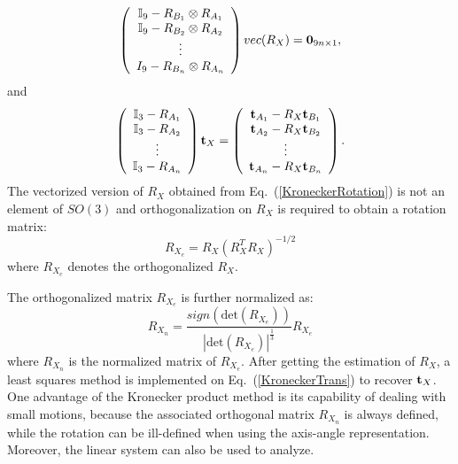 \documentclass[twocolumn,10pt]{asme2ej}
\newcommand{\ttt}{{\bf t}}
\begin{document}
\begin{equation}
\left(
\begin{array}{c}
\mathbb{I}_{9} - R_{B_{1}} \otimes R_{A_{1}}\\
\mathbb{I}_{9} - R_{B_{2}} \otimes R_{A_{2}}\\
\vdots\\
I_{9} - R_{B_{n}} \otimes R_{A_{n}}
\end{array}
\right) 
vec(R_{X})
 = {\bf{0}}_{9 n \times 1},
\label{KroneckerRotation}
\end{equation}
and
\begin{equation}
\left(
\begin{array}{c}
\mathbb{I}_{3} - R_{A_{1}} \\
\mathbb{I}_{3} - R_{A_{2}} \\
\vdots\\
\mathbb{I}_{3} - R_{A_{n}}
\end{array}
\right) 
{\ttt_{X}}
 = 
\left( 
\begin{array}{c}
{\bf{t}}_{A_{1}} - R_{X}{\bf{t}}_{B_{1}}\\
{\bf{t}}_{A_{2}} - R_{X}{\bf{t}}_{B_{2}}\\
\vdots\\
{\bf{t}}_{A_{n}} - R_{X}{\bf{t}}_{B_{n}}\\
\end{array}
\right).
\label{KroneckerTrans}
\end{equation}
The vectorized version of $R_X$ obtained from Eq.~(\ref{KroneckerRotation}) is not an element of $SO(3)$ and
orthogonalization on $R_{X}$ is required to obtain a rotation matrix:%
\begin{equation}
R_{X_{e}} = R_{X}(R_{X}^{T}R_{X})^{-1/2}
\label{Orthogonolization}
\end{equation}
\cite{horn1986robot}
where $R_{X_{e}}$ denotes the orthogonalized $R_{X}$.

The orthogonalized matrix $R_{X_{e}}$ is further normalized as: %
\begin{equation}
R_{X_{n}} = \dfrac{sign(\textrm{det}(R_{X_{e}}))}{{|\textrm{det}(R_{X_{e}})|}^{\tfrac{1}{3}}}R_{X_{e}}
\label{kron_normal}
\end{equation}
where $R_{X_{n}}$ is the normalized matrix of $R_{X_{e}}$.
After getting the estimation of $R_{X}$, a least squares method is implemented on Eq.~(\ref{KroneckerTrans}) to recover $\ttt_{X}$. One advantage of the Kronecker product method is its capability of dealing with small motions, because the associated orthogonal matrix $R_{X_{n}}$ is always defined, while the rotation can be ill-defined when using the axis-angle representation. Moreover, the linear system can also be used to analyze.
\end{document}
